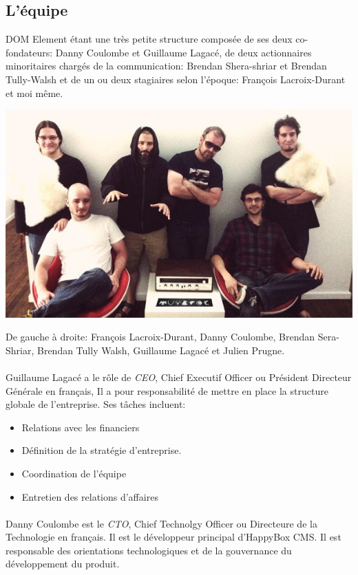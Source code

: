 \documentclass[11pt, a4paper ]{article}
\begin{document}
\begin{spacing}{1.5}
		\subsection{L'équipe} %
DOM Element étant une très petite structure composée de ses deux co-fondateurs: Danny Coulombe et Guillaume Lagacé, de deux actionnaires minoritaires chargés de la communication: Brendan Shera-shriar et Brendan Tully-Walsh et de un ou deux stagiaires selon l'époque: François Lacroix-Durant et moi même.
\begin{center}
	\includegraphics[width=\textwidth]{images/team/team.jpg}

	 De gauche à droite: François Lacroix-Durant, Danny Coulombe, Brendan Sera-Shriar, Brendan Tully Walsh, Guillaume Lagacé et Julien Prugne.
\end{center}

\paragraph{}
	Guillaume Lagacé a le rôle de \emph{CEO}, Chief Executif Officer ou Président Directeur Générale en français, Il a pour responsabilité de mettre en place la structure globale de l'entreprise.
	Ses tâches incluent:

		\begin{itemize}
			\item
				Relations avec les financiers
			\item
				Définition de la stratégie d'entreprise.
			\item
				Coordination de l'équipe
			\item
				Entretien des relations d'affaires
		\end{itemize}

\paragraph{}
Danny Coulombe est le \emph{CTO}, Chief Technolgy Officer ou Directeure de la Technologie en français. Il est le développeur principal d'HappyBox CMS. Il est responsable des orientations technologiques et de la gouvernance du développement du produit.


\end{spacing}
\end{document}
